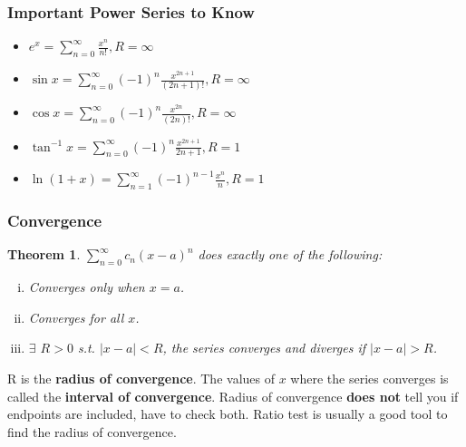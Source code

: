 \documentclass[12 pt]{article}
\newtheorem{thm}{Theorem}
\theoremstyle{definition}
\begin{document}
\subsubsection{Important Power Series to Know}
\begin{itemize}
	\item $e^x=\sum_{n=0}^{\infty}\frac{x^n}{n!}, R=\infty$
	\item $\sin{x}=\sum_{n=0}^{\infty}(-1)^n \frac{x^{2n+1}}{(2n+1)!},R=\infty$
	\item $\cos{x}=\sum_{n=0}^{\infty}(-1)^n \frac{x^{2n}}{(2n)!}, R=\infty$
	\item $\tan^{-1}{x}=\sum_{n=0}^{\infty}(-1)^n \frac{x^{2n+1}}{2n+1}, R=1$
	\item $\ln{(1+x)}=\sum_{n=1}^{\infty}(-1)^{n-1}\frac{x^n}{n}, R=1$
\end{itemize}
\subsubsection{Convergence}
\begin{thm}
	$\sum_{n=0}^{\infty}c_n(x-a)^n$ does exactly one of the following:
	\begin{enumerate}[(i)]
		\item Converges only when $x=a$.
		\item Converges for all $x$.
		\item $\exists$ $R>0$ s.t. $|x-a|<R$, the series converges and diverges if $|x-a|>R$.
	\end{enumerate}
\end{thm}
	R is the \textbf{radius of convergence}. The values of $x$ where the series converges is called the \textbf{interval of convergence}. Radius of convergence \textbf{does not} tell you if endpoints are included, have to check both. Ratio test is usually a good tool to find the radius of convergence.
\end{document}
